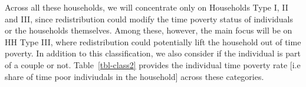 \documentclass[
  11pt,
]{article}
\begin{document}
Across all these households, we will concentrate only on Households Type
I, II and III, since redistribution could modify the time poverty status
of individuals or the households themselves. Among these, however, the
main focus will be on HH Type III, where redistribution could
potentially lift the household out of time poverty. In addition to this
classification, we also consider if the individual is part of a couple
or not. Table~\ref{tbl-class2} provides the individual time poverty rate
{[}i.e share of time poor indiviudals in the household{]} across these
categories.

\begin{table}[H]

\caption{\label{tbl-class2}Individual Classification for Redistribution
Analysis: Time Poverty Rate}


\end{table}%
\end{document}
